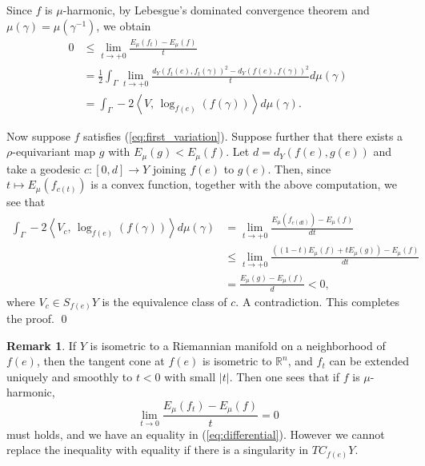\documentclass[12pt]{amsart}
\numberwithin{equation}{section}
\theoremstyle{plain}
\theoremstyle{definition}
\newtheorem{Remark}[Theorem]{Remark}
\theoremstyle{remark}
\newcommand{\R}{{\mathbb R}}
\newcommand{\tcprj}{\log}
\newcommand{\ene}[1]{E_{#1}}
\newcommand{\inner}[2]{\left\langle #1,\, #2 \right\rangle}
\begin{document}
 Since $f$ is $\mu$-harmonic, by Lebesgue's dominated convergence
 theorem and $\mu(\gamma)=\mu(\gamma^{-1})$, we obtain
\begin{equation}
 \label{eq:differential}
\begin{split}
  0 & \leq \lim_{t\to +0} \frac{\ene{\mu}(f_t)-\ene{\mu}(f)}{t} \\
    &= \frac{1}{2}\int_{\Gamma} \lim_{t\to +0}
   \frac{d_Y(f_t(e),f_t(\gamma))^2-d_Y(f(e),f(\gamma))^2}{t} d\mu(\gamma) \\
    & = \int_{\Gamma} -2\inner{V}{\tcprj_{f(e)}(f(\gamma))} d\mu(\gamma).
\end{split}
\end{equation}

 Now suppose $f$ satisfies (\ref{eq:first_variation}).  
 Suppose further that there exists a $\rho$-equivariant map $g$ with
 $\ene{\mu}(g)<\ene{\mu}(f)$. 
 Let $d=d_Y(f(e),g(e))$ and take a geodesic 
 $c\colon [0,d]\rightarrow Y$ joining $f(e)$ to $g(e)$. 
 Then, since $t \mapsto E_{\mu}(f_{c(t)})$ is a convex function, 
 together with the above computation, we see that 
\begin{equation*}
\begin{split}
  \int_{\Gamma} 
   -2\inner{V_c}{\tcprj_{f(e)}(f(\gamma))} d\mu(\gamma)
 & = \lim_{t\to +0}\frac{\ene{\mu}(f_{c(dt)})-\ene{\mu}(f)}{dt} \\
 & \leq \lim_{t\to +0} \frac{\left((1-t)\ene{\mu}(f)+t
 \ene{\mu}(g)\right)-\ene{\mu}(f)}{dt}\\ 
 & =\frac{\ene{\mu}(g)-\ene{\mu}(f)}{d} < 0,
\end{split}
\end{equation*}
 where $V_c \in S_{f(e)}Y$ is the equivalence class of $c$. 
 A contradiction. 
 This completes the proof. 
 \qed 

\begin{Remark}
\label{rem:if_eudlidean}
 If $Y$ is isometric to a Riemannian manifold on a neighborhood of
 $f(e)$, then the tangent cone at $f(e)$ is isometric to $\R^n$, 
 and $f_t$ can be extended uniquely and smoothly to $t<0$ with small 
 $|t|$. 
 Then one sees that if $f$ is $\mu$-harmonic, 
 \begin{equation*}
  \lim_{t\to 0} \frac{\ene{\mu}(f_t)-\ene{\mu}(f)}{t}=0
 \end{equation*}
 must holds, and we have an equality in (\ref{eq:differential}). 
 However we cannot replace the inequality with equality if there is a
 singularity in $TC_{f(e)}Y$. 
\end{Remark}
\end{document}
